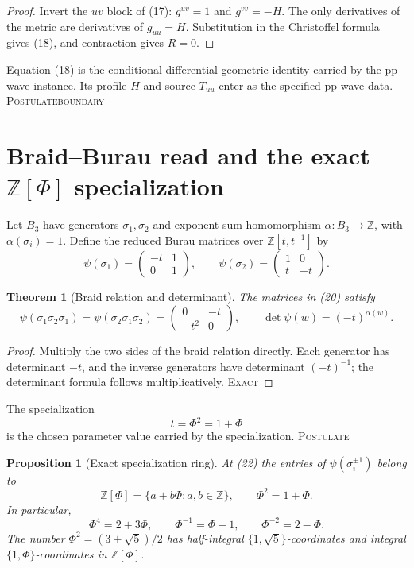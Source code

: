 \documentclass[10pt]{article}
\newtheorem{theorem}[definition]{Theorem}
\newtheorem{proposition}[definition]{Proposition}
\theoremstyle{remark}
\newcommand{\Z}{\mathbb Z}
\newcommand{\cstatus}[1]{\hfill\textsc{#1}}
\newcommand{\exact}{\textsc{Exact}}
\newcommand{\postulate}{\textsc{Postulate}}
\begin{document}
\begin{proof}
Invert the $uv$ block of (17): $g^{uv}=1$ and $g^{vv}=-H$.  The only
derivatives of the metric are derivatives of $g_{uu}=H$.  Substitution in the
Christoffel formula gives (18), and contraction gives $R=0$.
\end{proof}

Equation (18) is the conditional differential-geometric identity carried by
the pp-wave instance.  Its profile $H$ and source $T_{uu}$ enter as the
specified pp-wave data. \cstatus{\postulate boundary}

\section{Braid--Burau read and the exact \texorpdfstring{$\mathbb Z[\Phi]$}{Z[Phi]} specialization}

Let $B_3$ have generators $\sigma_1,\sigma_2$ and exponent-sum homomorphism
$\alpha:B_3\to\Z$, with $\alpha(\sigma_i)=1$.  Define the reduced Burau
matrices over $\Z[t,t^{-1}]$ by
\[
 \psi(\sigma_1)=\begin{pmatrix}-t&1\\0&1\end{pmatrix},\qquad
 \psi(\sigma_2)=\begin{pmatrix}1&0\\t&-t\end{pmatrix}.
\tag{20}
\]

\begin{theorem}[Braid relation and determinant]\label{thm:burau}
The matrices in (20) satisfy
\[
 \psi(\sigma_1\sigma_2\sigma_1)
=\psi(\sigma_2\sigma_1\sigma_2)
=\begin{pmatrix}0&-t\\-t^2&0\end{pmatrix},
\qquad
 \det\psi(w)=(-t)^{\alpha(w)}.
\tag{21}
\]
\end{theorem}

\begin{proof}
Multiply the two sides of the braid relation directly.  Each generator has
determinant $-t$, and the inverse generators have determinant $(-t)^{-1}$;
the determinant formula follows multiplicatively. \cstatus{\exact}
\end{proof}

The specialization
\[
 t=\Phi^2=1+\Phi
\tag{22}
\]
is the chosen parameter value carried by the specialization.
\cstatus{\postulate}

\begin{proposition}[Exact specialization ring]\label{prop:ring}
At (22) the entries of $\psi(\sigma_i^{\pm1})$ belong to
\[
 \Z[\Phi]=\{a+b\Phi:a,b\in\Z\},\qquad \Phi^2=1+\Phi.
\tag{23}
\]
In particular,
\[
 \Phi^4=2+3\Phi,\qquad \Phi^{-1}=\Phi-1,\qquad
 \Phi^{-2}=2-\Phi.
\tag{24}
\]
The number $\Phi^2=(3+\sqrt5)/2$ has half-integral
$\{1,\sqrt5\}$-coordinates and integral $\{1,\Phi\}$-coordinates in
$\Z[\Phi]$.
\end{proposition}
\end{document}
